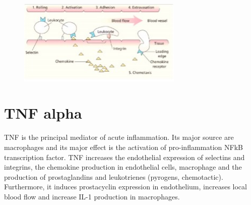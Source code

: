 \begin{figure}[ht]
\includegraphics[width=0.7\textwidth]{leuko}
\caption{\label{fig:leuko}}
\end{figure}
 
\section{TNF alpha}
TNF is the principal mediator of acute inflammation.
Its major source are macrophages and its major effect is the activation of pro-inflammation NFkB transcription factor.
TNF increases the endothelial expression of selectins and integrins, the chemokine production in endothelial cells, macrophage and the production of prostaglandins and leukotrienes (pyrogens, chemotactic). 
Furthermore, it induces prostacyclin expression in endothelium, increases local blood flow and increase IL-1 production in macrophages.

